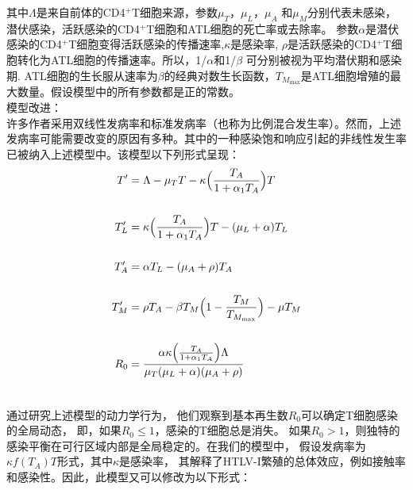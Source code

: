 \documentclass[12pt,a4paper]{article}
\begin{document}
	\large
	{其中$\Lambda$是来自前体的CD4$^+$T细胞来源，参数$\mu_{T}$，$\mu_{L}$，$\mu_{A}$
	和$\mu_{M}$分别代表未感染，潜伏感染，活跃感染的CD4$^+$T细胞和ATL细胞的死亡率或去除率。
	参数$\alpha$是潜伏感染的CD4$^+$T细胞变得活跃感染的传播速率,$\kappa$是感染率,
	$\rho$是活跃感染的CD4$^+$T细胞转化为ATL细胞的传播速率。所以，1/$\alpha$和1/$\beta$ 可分别被视为平均潜伏期和感染期. ATL细胞的生长服从速率为$\beta$的经典对数生长函数，$T_{M_{\max}}$是ATL细胞增殖的最大数量。假设模型中的所有参数都是正的常数。\\

	\noindent 模型改进：\\
	

	许多作者采用双线性发病率和标准发病率（也称为比例混合发生率）。然而，上述发病率可能需要改变的原因有多种。其中的一种感染饱和响应引起的非线性发生率已被纳入上述模型中。该模型以下列形式呈现：\\


	\begin{equation}
	\begin{aligned}
	T' &= \Lambda-\mu_{T}T-\kappa \Bigl( \frac{T_{A}}{1+\alpha_{1}T_{A}} \Bigr) T\\\\
	T'_{L} &= \kappa\Bigl(\frac{T_{A}}{1+\alpha_{1}T_{A}} \Bigr)T-(\mu_{L}+\alpha) T_{L}\\\\
	T'_{A} &= \alpha T_{L} - (\mu_{A} + \rho)T_{A}\\\\
	T'_{M} &= \rho T_{A}-\beta T_{M} \Bigl( 1 - \frac{T_{M}}{T_{M_{\max}}} \Bigr)- \mu T_{M}\\\\
	R_{0} &= \frac{\alpha \kappa \Bigl( \frac{T_{A}}{1 + \alpha_{1} T_{A}} \Bigr) \Lambda}{\mu_{T} (\mu_{L} + \alpha) (\mu_{A} + \rho)}\\\\
	\end{aligned}
	\end{equation}




	通过研究上述模型的动力学行为，
	他们观察到基本再生数$R_{0}$可以确定T细胞感染的全局动态，
	即，如果$R_{0}\leq1$，感染的T细胞总是消失。
	如果$R_{0}>1$，则独特的感染平衡在可行区域内部是全局稳定的。在我们的模型中，
	假设发病率为$\kappa f(T_{A}) T$形式，其中$\kappa$是感染率，
	其解释了HTLV-I繁殖的总体效应，例如接触率和感染性。因此，此模型又可以修改为以下形式：\\

}
\end{document}

